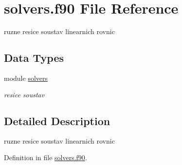 \hypertarget{solvers_8f90}{\section{solvers.\-f90 \-File \-Reference}
\label{solvers_8f90}
}


ruzne resice soustav linearnich rovnic  


\subsection*{\-Data \-Types}
\begin{DoxyCompactItemize}
\item 
module \hyperlink{classsolvers}{solvers}
\begin{DoxyCompactList}\small\item\em resice soustav \end{DoxyCompactList}\end{DoxyCompactItemize}


\subsection{\-Detailed \-Description}
ruzne resice soustav linearnich rovnic 

\-Definition in file \hyperlink{solvers_8f90_source}{solvers.\-f90}.


